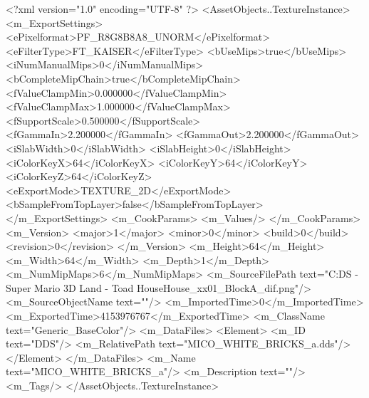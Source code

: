 <?xml version="1.0" encoding="UTF-8" ?>
<AssetObjects..TextureInstance>
	<m_ExportSettings>
		<ePixelformat>PF_R8G8B8A8_UNORM</ePixelformat>
		<eFilterType>FT_KAISER</eFilterType>
		<bUseMips>true</bUseMips>
		<iNumManualMips>0</iNumManualMips>
		<bCompleteMipChain>true</bCompleteMipChain>
		<fValueClampMin>0.000000</fValueClampMin>
		<fValueClampMax>1.000000</fValueClampMax>
		<fSupportScale>0.500000</fSupportScale>
		<fGammaIn>2.200000</fGammaIn>
		<fGammaOut>2.200000</fGammaOut>
		<iSlabWidth>0</iSlabWidth>
		<iSlabHeight>0</iSlabHeight>
		<iColorKeyX>64</iColorKeyX>
		<iColorKeyY>64</iColorKeyY>
		<iColorKeyZ>64</iColorKeyZ>
		<eExportMode>TEXTURE_2D</eExportMode>
		<bSampleFromTopLayer>false</bSampleFromTopLayer>
	</m_ExportSettings>
	<m_CookParams>
		<m_Values/>
	</m_CookParams>
	<m_Version>
		<major>1</major>
		<minor>0</minor>
		<build>0</build>
		<revision>0</revision>
	</m_Version>
	<m_Height>64</m_Height>
	<m_Width>64</m_Width>
	<m_Depth>1</m_Depth>
	<m_NumMipMaps>6</m_NumMipMaps>
	<m_SourceFilePath text="C:\Users\micka\Downloads\3DS - Super Mario 3D Land - Toad House\Toad House\Tex\worldmap_xx01_BlockA_dif.png"/>
	<m_SourceObjectName text=""/>
	<m_ImportedTime>0</m_ImportedTime>
	<m_ExportedTime>4153976767</m_ExportedTime>
	<m_ClassName text="Generic_BaseColor"/>
	<m_DataFiles>
		<Element>
			<m_ID text="DDS"/>
			<m_RelativePath text="MICO_WHITE_BRICKS_a.dds"/>
		</Element>
	</m_DataFiles>
	<m_Name text="MICO_WHITE_BRICKS_a"/>
	<m_Description text=""/>
	<m_Tags/>
</AssetObjects..TextureInstance>

